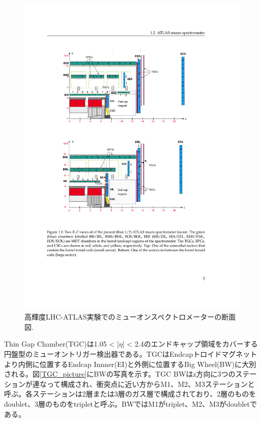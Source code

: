 \begin{figure} 
\centering
\includegraphics[width=16cm]{fig/Intro/Muonspectrometer.pdf}
\caption[高輝度LHC-ATLAS実験でのミューオンスペクトロメーターの断面図]{高輝度LHC-ATLAS実験でのミューオンスペクトロメーターの断面図.\cite{tdr_phase2muon_2017017}
}
\label{Muonspectrometer2}
\end{figure}


Thin Gap Chamber(TGC)は1.05 < |$\eta$| < 2.4のエンドキャップ領域をカバーする円盤型のミューオントリガー検出器である。TGCはEndcapトロイドマグネットより内側に位置するEndcap Innner(EI)と外側に位置するBig Wheel(BW)に大別される。図\ref{TGC_picture}にBWの写真を示す。TGC BWはz方向に3つのステーションが連なって構成され、衝突点に近い方からM1、M2、M3ステーションと呼ぶ。各ステーションは2層または3層のガス層で構成されており、2層のものをdoublet、3層のものをtripletと呼ぶ。BWではM1がtriplet、M2、M3がdoubletである。

